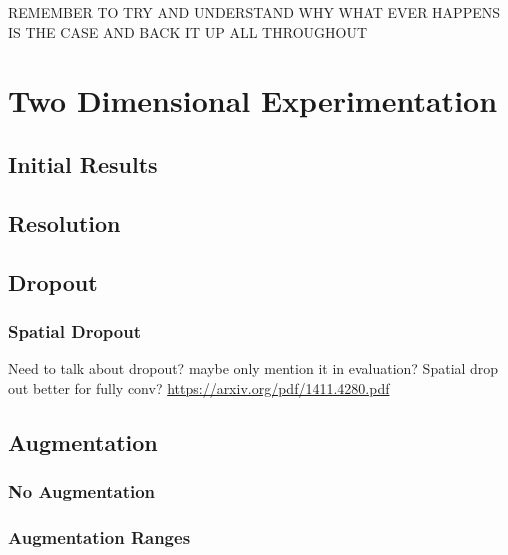REMEMBER TO TRY AND UNDERSTAND WHY WHAT EVER HAPPENS IS THE CASE AND BACK IT UP ALL THROUGHOUT

\section{Two Dimensional Experimentation}

\subsection{Initial Results}

\subsection{Resolution}

\subsection{Dropout}

\subsubsection{Spatial Dropout}

Need to talk about dropout? maybe only mention it in evaluation?
Spatial drop out better for fully conv? \url{https://arxiv.org/pdf/1411.4280.pdf}


\subsection{Augmentation}
\label{sec:evalaugmentation}

\subsubsection{No Augmentation}

\subsubsection{Augmentation Ranges}

